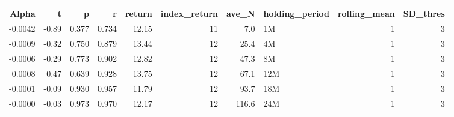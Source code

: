 \begin{table}[ht]
\centering
\begin{tabular}{rrrrrrrlrr}
  \hline
Alpha & t & p & r & return & index\_return & ave\_N & holding\_period & rolling\_mean & SD\_thres \\ 
  \hline
-0.0042 & -0.89 & 0.377 & 0.734 & 12.15 & 11 & 7.0 & 1M &  1 &  3 \\ 
  -0.0009 & -0.32 & 0.750 & 0.879 & 13.44 & 12 & 25.4 & 4M &  1 &  3 \\ 
  -0.0006 & -0.29 & 0.773 & 0.902 & 12.82 & 12 & 47.3 & 8M &  1 &  3 \\ 
  0.0008 & 0.47 & 0.639 & 0.928 & 13.75 & 12 & 67.1 & 12M &  1 &  3 \\ 
  -0.0001 & -0.09 & 0.930 & 0.957 & 11.79 & 12 & 93.7 & 18M &  1 &  3 \\ 
  -0.0000 & -0.03 & 0.973 & 0.970 & 12.17 & 12 & 116.6 & 24M &  1 &  3 \\ 
   \hline
\end{tabular}
\end{table}

